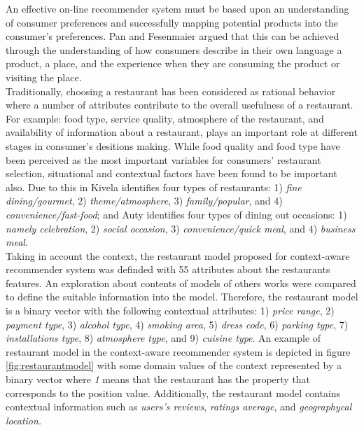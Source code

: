An effective on-line recommender system must be based upon an
understanding of consumer  preferences and successfully mapping
potential products into the consumer's
preferences\cite{adomavicius2011context}. Pan and
Fesenmaier\cite{pan2006online} argued that this can be achieved
through the understanding of how consumers describe in their own
language a product, a place, and the experience when they are
consuming the product or visiting the place.\\ Traditionally, choosing
a restaurant has been considered as rational behavior where a number
of attributes contribute to the overall usefulness of a restaurant.
For example: food type, service quality, atmosphere of the restaurant,
and availability of information about a restaurant, plays an important
role at different stages in consumer's desitions
making\cite{auty1992consumer}. While food quality and food type have
been perceived as the most important variables for consumers'
restaurant selection, situational and contextual factors have been
found to be important also. Due to this in
Kivela\cite{jack1997restaurant} identifies four types of restaurants:
1) \textit{fine dining/gourmet}, 2) \textit{theme/atmosphere}, 3)
\textit{family/popular}, and 4) \textit{convenience/fast-food}; and
Auty\cite{auty1992consumer} identifies four types of dining out
occasions: 1) \textit{namely celebration}, 2) \textit{social
occasion}, 3) \textit{convenience/quick meal}, and 4) \textit{business
meal}.\\ Taking in account the context, the restaurant model proposed
for context-aware recommender system was definded with 55 attributes
about the restaurants features. An exploration about contents of
models of others works were compared to define the suitable
information into the model. Therefore, the restaurant model is a
binary vector with the following contextual attributes: 1)
\textit{price range}, 2) \textit{payment type}, 3) \textit{alcohol
type}, 4) \textit{smoking area}, 5) \textit{dress code}, 6)
\textit{parking type}, 7) \textit{installations type}, 8)
\textit{atmosphere type}, and 9) \textit{cuisine type}. An example of
restaurant model in the context-aware recommender system is depicted
in figure \ref{fig:restaurantmodel} with some domain values of the
context represented by a binary vector where \textit{1} means that the
restaurant has the property that corresponds to the position value.
Additionally, the restaurant model contains contextual information
such as \textit{users's reviews}, \textit{ratings average}, and
\textit{geographycal location.}\\
